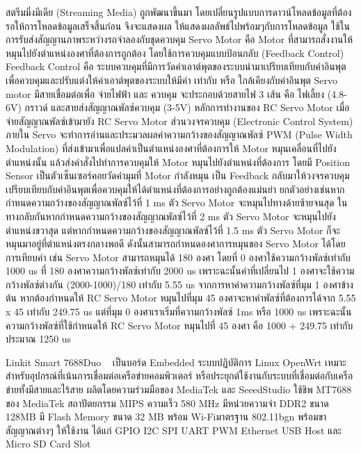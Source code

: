สตรีมมิ่งมีเดีย (Streaming Media) ถูกพัฒนาขึ้นมา โดยเปลี่ยนรูปแบบการดาวน์โหลดข้อมูลที่ต้องรอให้การโหลดข้อมูลเสร็จสิ้นก่อน จึงจะแสดงผล ให้แสดงผลลัพธ์ไปพร้อมๆกับการโหลดข้อมูล ใช้ในการรับส่งสัญญานภาพระหว่างรถจำลองกับชุดควบคุม
Servo Motor คือ Motor ที่สามารถสั่งงานให้หมุนไปยังตำแหน่งองศาที่ต้องการถูกต้อง โดยใช้การควบคุมแบบป้อนกลับ (Feedback Control)  Feedback Control คือ ระบบควบคุมที่มีการวัดค่าเอาต์พุตของระบบนำมาเปรียบเทียบกับค่าอินพุตเพื่อควบคุมและปรับแต่งให้ค่าเอาต์พุตของระบบให้มีค่า เท่ากับ หรือ ใกล้เคียงกับค่าอินพุต Servo motor มีสายเชื่อมต่อเพื่อ จ่ายไฟฟ้า และ ควบคุม จะประกอบด้วยสายไฟ 3 เส้น คือ ไฟเลี้ยง (4.8-6V) กราวด์ และสายส่งสัญญาณพัลซ์ควบคุม (3-5V) 
หลักการทำงานของ RC Servo Motor เมื่อจ่ายสัญญาณพัลซ์เข้ามายัง RC Servo Motor ส่วนวงจรควบคุม (Electronic Control System) ภายใน Servo จะทำการอ่านและประมวลผลค่าความกว้างของสัญญาณพัลซ์ PWM (Pulse Width Modulation) ที่ส่งเข้ามาเพื่อแปลค่าเป็นตำแหน่งองศาที่ต้องการให้ Motor หมุนเคลื่อนที่ไปยังตำแหน่งนั้น แล้วส่งคำสั่งไปทำการควบคุมให้ Motor หมุนไปยังตำแหน่งที่ต้องการ โดยมี Position Sensor เป็นตัวเซ็นเซอร์คอยวัดค่ามุมที่ Motor กำลังหมุน เป็น Feedback กลับมาให้วงจรควบคุมเปรียบเทียบกับค่าอินพุตเพื่อควบคุมให้ได้ตำแหน่งที่ต้องการอย่างถูกต้องแม่นยำ
ยกตัวอย่างเช่นหากกำหนดความกว้างของสัญญาณพัลซ์ไว้ที่ 1 ms ตัว Servo Motor จะหมุนไปทางด้ายซ้ายจนสุด ในทางกลับกันหากกำหนดความกว้างของสัญญาณพัลซ์ไว้ที่ 2 ms ตัว Servo Motor จะหมุนไปยังตำแหน่งขวาสุด แต่หากกำหนดความกว้างของสัญญาณพัลซ์ไว้ที่ 1.5 ms ตัว Servo Motor ก็จะหมุนมาอยู่ที่ตำแหน่งตรงกลางพอดี ดังนั้นสามารถกำหนดองศาการหมุนของ Servo Motor ได้โดยการเทียบค่า เช่น Servo Motor สามารถหมุนได้ 180 องศา โดยที่ 0 องศาใช้ความกว้างพัลซ์เท่ากับ 1000 us ที่ 180 องศาความกว้างพัลซ์เท่ากับ 2000 us เพราะฉะนั้นค่าที่เปลี่ยนไป 1 องศาจะใช้ความกว้างพัลซ์ต่างกัน (2000-1000)/180 เท่ากับ 5.55 us 
จากการหาค่าความกว้างพัลซ์ที่มุม 1 องศาข้างต้น หากต้องกำหนดให้ RC Servo Motor หมุนไปที่มุม 45 องศาจะหาค่าพัลซ์ที่ต้องการได้จาก 5.55 x 45 เท่ากับ 249.75 us แต่ที่มุม 0 องศาเราเริ่มที่ความกว้างพัลซ์ 1ms หรือ 1000 us เพราะฉะนั้นความกว้างพัลซ์ที่ใช้กำหนดให้ RC Servo Motor หมุนไปที่ 45 องศา คือ 1000 + 249.75 เท่ากับประมาณ 1250 us


Linkit Smart 7688Duo   เป็นบอร์ด Embedded ระบบปฏิบัติการ Linux OpenWrt  เหมาะสำหรับอุปกรณ์ที่เน้นการเชื่อมต่อเครือข่ายคอมพิวเตอร์ หรือประยุกต์ใช้งานกับระบบที่เชื่อมต่อกับเครือข่ายทั้งมีสายและไร้สาย ผลิตโดยความร่วมมือของ MediaTek และ SeeedStudio ใช้ชิพ MT7688 ของ MediaTek สถาปัตยกรรม MIPS ความเร็ว 580 MHz มีหน่วยความจำ DDR2 ขนาด 128MB มี Flash Memory ขนาด 32 MB พร้อม Wi-Fiมาตรฐาน 802.11bgn พร้อมขาสัญญาณต่างๆ ให้ใช้งาน ได้แก่ GPIO I2C SPI UART PWM Ethernet USB Host และ Micro SD Card Slot


